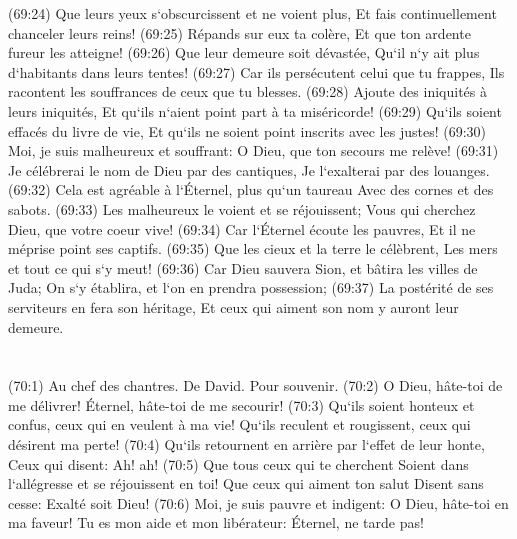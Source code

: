 \verse (69:24) Que leurs yeux s`obscurcissent et ne voient plus, Et fais continuellement chanceler leurs reins! 
\verse (69:25) Répands sur eux ta colère, Et que ton ardente fureur les atteigne! 
\verse (69:26) Que leur demeure soit dévastée, Qu`il n`y ait plus d`habitants dans leurs tentes! 
\verse (69:27) Car ils persécutent celui que tu frappes, Ils racontent les souffrances de ceux que tu blesses. 
\verse (69:28) Ajoute des iniquités à leurs iniquités, Et qu`ils n`aient point part à ta miséricorde! 
\verse (69:29) Qu`ils soient effacés du livre de vie, Et qu`ils ne soient point inscrits avec les justes! 
\verse (69:30) Moi, je suis malheureux et souffrant: O Dieu, que ton secours me relève! 
\verse (69:31) Je célébrerai le nom de Dieu par des cantiques, Je l`exalterai par des louanges. 
\verse (69:32) Cela est agréable à l`Éternel, plus qu`un taureau Avec des cornes et des sabots. 
\verse (69:33) Les malheureux le voient et se réjouissent; Vous qui cherchez Dieu, que votre coeur vive! 
\verse (69:34) Car l`Éternel écoute les pauvres, Et il ne méprise point ses captifs. 
\verse (69:35) Que les cieux et la terre le célèbrent, Les mers et tout ce qui s`y meut! 
\verse (69:36) Car Dieu sauvera Sion, et bâtira les villes de Juda; On s`y établira, et l`on en prendra possession; 
\verse (69:37) La postérité de ses serviteurs en fera son héritage, Et ceux qui aiment son nom y auront leur demeure. 

\chapter{}

\verse (70:1) Au chef des chantres. De David. Pour souvenir. (70:2) O Dieu, hâte-toi de me délivrer! Éternel, hâte-toi de me secourir! 
\verse (70:3) Qu`ils soient honteux et confus, ceux qui en veulent à ma vie! Qu`ils reculent et rougissent, ceux qui désirent ma perte! 
\verse (70:4) Qu`ils retournent en arrière par l`effet de leur honte, Ceux qui disent: Ah! ah! 
\verse (70:5) Que tous ceux qui te cherchent Soient dans l`allégresse et se réjouissent en toi! Que ceux qui aiment ton salut Disent sans cesse: Exalté soit Dieu! 
\verse (70:6) Moi, je suis pauvre et indigent: O Dieu, hâte-toi en ma faveur! Tu es mon aide et mon libérateur: Éternel, ne tarde pas! 

\chapter{}

